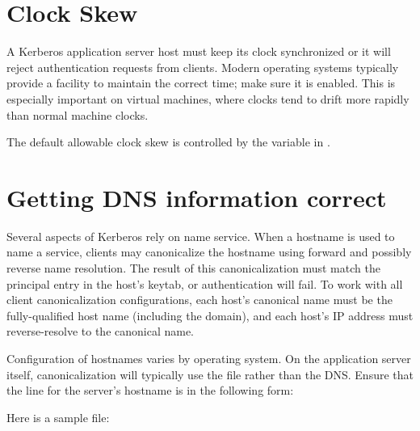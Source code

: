 \documentclass[letterpaper,10pt,english]{sphinxmanual}
\begin{document}
\section{Clock Skew}
\label{\detokenize{admin/appl_servers:clock-skew}}
A Kerberos application server host must keep its clock synchronized or
it will reject authentication requests from clients.  Modern operating
systems typically provide a facility to maintain the correct time;
make sure it is enabled.  This is especially important on virtual
machines, where clocks tend to drift more rapidly than normal machine
clocks.

The default allowable clock skew is controlled by the 
variable in {\hyperref[\detokenize{admin/conf_files/krb5_conf:libdefaults}]{}}.


\section{Getting DNS information correct}
\label{\detokenize{admin/appl_servers:getting-dns-information-correct}}
Several aspects of Kerberos rely on name service.  When a hostname is
used to name a service, clients may canonicalize the hostname using
forward and possibly reverse name resolution.  The result of this
canonicalization must match the principal entry in the host’s keytab,
or authentication will fail.  To work with all client canonicalization
configurations, each host’s canonical name must be the fully-qualified
host name (including the domain), and each host’s IP address must
reverse-resolve to the canonical name.

Configuration of hostnames varies by operating system.  On the
application server itself, canonicalization will typically use the
 file rather than the DNS.  Ensure that the line for the
server’s hostname is in the following form:

%
\begin{sphinxVerbatim}[commandchars=\\\{\}]
                
\end{sphinxVerbatim}

Here is a sample  file:

%
\begin{sphinxVerbatim}[commandchars=\\\{\}]
       
          
\end{sphinxVerbatim}
\end{document}
